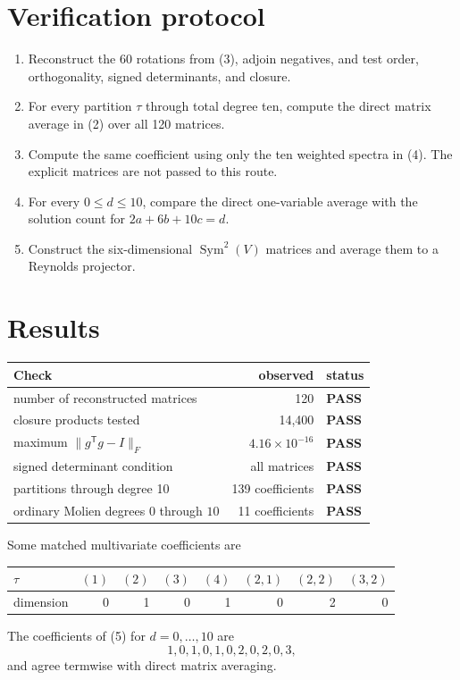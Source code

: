 \documentclass[11pt]{article}
\newcommand{\Sym}{\operatorname{Sym}}
\newcommand{\PASS}{\textcolor{passgreen}{\textbf{PASS}}}
\begin{document}
\section{Verification protocol}

\begin{enumerate}[leftmargin=*,itemsep=3pt]
\item Reconstruct the 60 rotations from (3), adjoin negatives, and test order,
orthogonality, signed determinants, and closure.
\item For every partition $\tau$ through total degree ten, compute the direct
matrix average in (2) over all 120 matrices.
\item Compute the same coefficient using only the ten weighted spectra in (4).
The explicit matrices are not passed to this route.
\item For every $0\leq d\leq10$, compare the direct one-variable average with
the solution count for $2a+6b+10c=d$.
\item Construct the six-dimensional $\Sym^2(V)$ matrices and average them to a
Reynolds projector.
\end{enumerate}

\section{Results}

\begin{center}
\begin{tabularx}{\linewidth}{@{}XrX@{}}
\toprule
Check & observed & status\\
\midrule
number of reconstructed matrices & 120 & \PASS\\
closure products tested & 14,400 & \PASS\\
maximum $\|g^{\mathsf T}g-I\|_F$ & $4.16\times10^{-16}$ & \PASS\\
signed determinant condition & all matrices & \PASS\\
partitions through degree 10 & 139 coefficients & \PASS\\
ordinary Molien degrees $0$ through $10$ & 11 coefficients & \PASS\\
\bottomrule
\end{tabularx}
\end{center}

Some matched multivariate coefficients are
\begin{center}
\begin{tabular}{@{}lrrrrrrr@{}}
\toprule
$\tau$ & $(1)$ & $(2)$ & $(3)$ & $(4)$ & $(2,1)$ & $(2,2)$ & $(3,2)$\\
\midrule
dimension & 0 & 1 & 0 & 1 & 0 & 2 & 0\\
\bottomrule
\end{tabular}
\end{center}
The coefficients of (5) for $d=0,\ldots,10$ are
\[
1,0,1,0,1,0,2,0,2,0,3,
\]
and agree termwise with direct matrix averaging.
\end{document}
